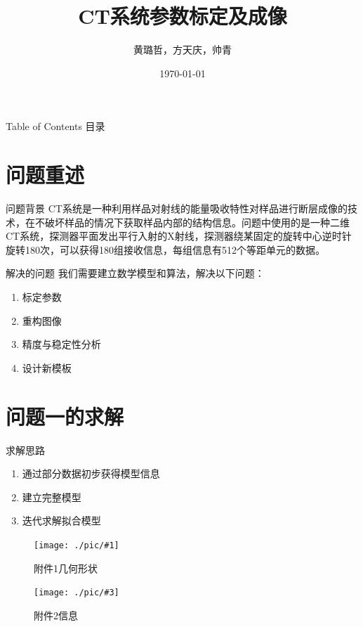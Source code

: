 \documentclass{beamer}
\newcommand{\doublepic}[4]{ \begin{figure}[H]
\begin{minipage}[H]{0.45\textwidth}
\centering
\texttt{[image: ./pic/\#1]}
\caption{#2}
\end{minipage}
\begin{minipage}[H]{0.45\textwidth}
\centering
\texttt{[image: ./pic/\#3]}
\caption{#4}
\end{minipage}
\end{figure}}
\begin{document}
 

\title{CT系统参数标定及成像}
\author{黄璐哲，方天庆，帅青}
\date{\today}

\begin{frame}[plain,t]
	\titlepage
\end{frame} 

\begin{frame}{Table of Contents 目录}
	\tableofcontents
\end{frame} 

\section{问题重述}
\begin{frame}{问题背景}
	CT系统是一种利用样品对射线的能量吸收特性对样品进行断层成像的技术，在不破坏样品的情况下获取样品内部的结构信息。问题中使用的是一种二维CT系统，探测器平面发出平行入射的X射线，探测器绕某固定的旋转中心逆时针旋转180次，可以获得180组接收信息，每组信息有512个等距单元的数据。
\end{frame} %

\begin{frame}{解决的问题}
	我们需要建立数学模型和算法，解决以下问题：
	\begin{enumerate}
		  
		\item 标定参数
		        
		\item 重构图像
		\item 精度与稳定性分析
		\item 设计新模板
	\end{enumerate}
\end{frame} %

\section{问题一的求解}

\begin{frame}{求解思路}
	\begin{enumerate}
		\item 通过部分数据初步获得模型信息
		\item 建立完整模型
		\item 迭代求解拟合模型
	\end{enumerate}
	\doublepic{fujian1.png}{附件1几何形状}{fujian2.png}{附件2信息}
\end{frame}
\end{document}
